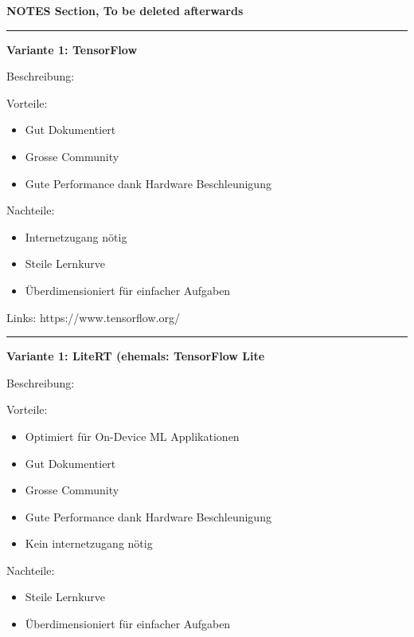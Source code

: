 

\newpage
\begin{Huge}
\textbf{NOTES Section, To be deleted afterwards}
\end{Huge}


\vspace{10pt}
\hrule
\textbf{Variante 1: TensorFlow}

Beschreibung:

Vorteile:
\begin{itemize}
    \item Gut Dokumentiert
    \item Grosse Community
    \item Gute Performance dank Hardware Beschleunigung
\end{itemize}


Nachteile:
\begin{itemize}
    \item Internetzugang nötig
    \item Steile Lernkurve
    \item Überdimensioniert für einfacher Aufgaben
\end{itemize}

Links: https://www.tensorflow.org/

\vspace{5pt}
\hrule

\textbf{Variante 1: LiteRT (ehemals: TensorFlow Lite}

Beschreibung:

Vorteile:
\begin{itemize}
    \item Optimiert für On-Device ML Applikationen
    \item Gut Dokumentiert
    \item Grosse Community
    \item Gute Performance dank Hardware Beschleunigung
    \item Kein internetzugang nötig
\end{itemize}


Nachteile:
\begin{itemize}
    \item Steile Lernkurve
    \item Überdimensioniert für einfacher Aufgaben
\end{itemize}

